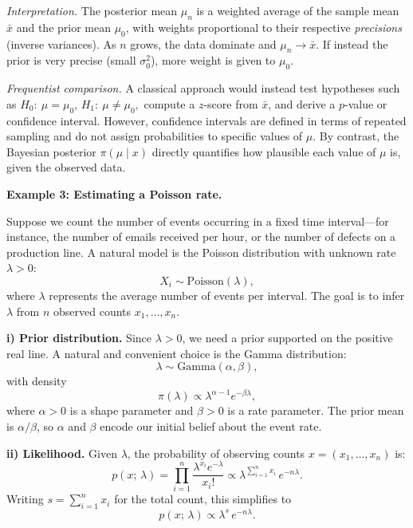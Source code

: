 \textit{Interpretation.} The posterior mean $\mu_n$ is a weighted average of the sample mean $\bar{x}$ and the prior mean $\mu_0$, with weights proportional to their respective \emph{precisions} (inverse variances). As $n$ grows, the data dominate and $\mu_n \to \bar{x}$. If instead the prior is very precise (small $\sigma_0^2$), more weight is given to $\mu_0$.

\medskip

\textit{Frequentist comparison.} A classical approach would instead test hypotheses such as \(H_0:\ \mu = \mu_0\), \(H_1:\ \mu \neq \mu_0,\)
compute a $z$-score from $\bar{x}$, and derive a $p$-value or confidence interval. However, confidence intervals are defined in terms of repeated sampling and do not assign probabilities to specific values of $\mu$. By contrast, the Bayesian posterior $\pi(\mu \mid x)$ directly quantifies how plausible each value of $\mu$ is, given the observed data.

\medskip

\textbf{Example 3: Estimating a Poisson rate.}

\medskip

Suppose we count the number of events occurring in a fixed time interval---for instance, the number of emails received per hour, or the number of defects on a production line. A natural model is the Poisson distribution with unknown rate $\lambda > 0$:
\[
    X_i \sim \mathrm{Poisson}(\lambda),
\]
where $\lambda$ represents the average number of events per interval. The goal is to infer $\lambda$ from $n$ observed counts $x_1,\dots,x_n$.

\medskip

\textbf{i) Prior distribution.} Since $\lambda > 0$, we need a prior supported on the positive real line. A natural and convenient choice is the Gamma distribution:
\[
    \lambda \sim \mathrm{Gamma}(\alpha, \beta),
\]
with density
\[
    \pi(\lambda) \propto \lambda^{\alpha-1} e^{-\beta\lambda},
\]
where $\alpha > 0$ is a shape parameter and $\beta > 0$ is a rate parameter. The prior mean is $\alpha/\beta$, so $\alpha$ and $\beta$ encode our initial belief about the event rate.

\medskip

\textbf{ii) Likelihood.} Given $\lambda$, the probability of observing counts $x = (x_1,\dots,x_n)$ is:
\[
    p(x;\,\lambda) = \prod_{i=1}^n \frac{\lambda^{x_i} e^{-\lambda}}{x_i!}
    \propto \lambda^{\sum_{i=1}^n x_i}\, e^{-n\lambda}.
\]
Writing $s = \sum_{i=1}^n x_i$ for the total count, this simplifies to
\[
    p(x;\,\lambda) \propto \lambda^{s}\, e^{-n\lambda}.
\]

